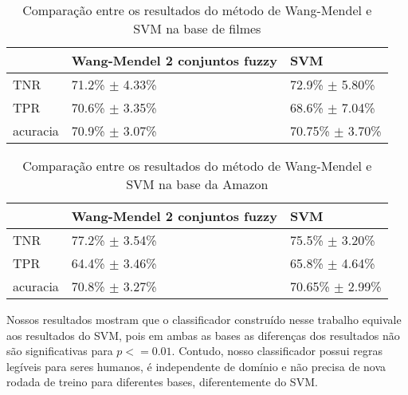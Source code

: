\documentclass[template.tex]{subfiles}
\begin{document}
\begin{table}[!h]
    \begin{tabular}{lll}
    ~         			& Wang-Mendel 2 conjuntos fuzzy						& SVM \\ \hline
    TNR 				& 71.2\% $\pm$ 4.33\%            								& 72.9\% $\pm$ 5.80\%    \\
    TPR    			& 70.6\% $\pm$ 3.35\%     									& 68.6\% $\pm$ 7.04\%   \\
    acuracia  		& 70.9\% $\pm$ 3.07\%             							& 70.75\% $\pm$ 3.70\%    \\
    \end{tabular}
    \caption{Comparação entre os resultados do método de Wang-Mendel e SVM na base de filmes}
	\label{table:movies_svm}
\end{table}

%
%
%

\begin{table}[!h]
    \begin{tabular}{lll}
    ~         				& Wang-Mendel 2 conjuntos fuzzy 							& SVM \\ \hline
    TNR 			     	& 77.2\% $\pm$ 3.54\%            									& 75.5\% $\pm$ 3.20\%    \\
    TPR    			   	& 64.4\% $\pm$ 3.46\%   											& 65.8\% $\pm$ 4.64\%   \\
    acuracia  		   & 70.8\% $\pm$ 3.27\%       										& 70.65\% $\pm$ 2.99\%    \\
    \end{tabular}
    \caption{Comparação entre os resultados do método de Wang-Mendel e SVM na base da Amazon}
	\label{table:amazon_svm}
\end{table}

%
%
%

Nossos resultados mostram que o classificador construído nesse trabalho equivale aos resultados do SVM, pois em ambas as bases as diferenças dos resultados não são significativas para $p <= 0.01$. Contudo, nosso classificador possui regras legíveis para seres humanos, é independente de domínio e não precisa de nova rodada de treino para diferentes bases, diferentemente do SVM.
\end{document}
